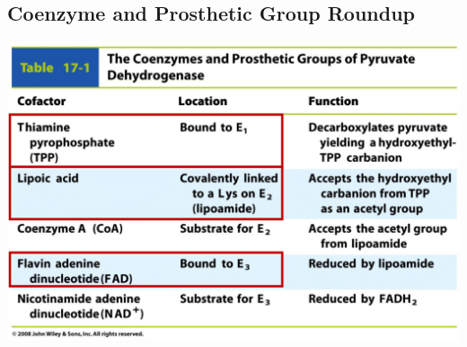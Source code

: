 \documentclass[10pt]{article}
\begin{document}
\subsection*{Coenzyme and Prosthetic Group Roundup}
\begin{center} 
	\includegraphics*[width=\textwidth]{L3_15.png}
\end{center}
\end{document}
